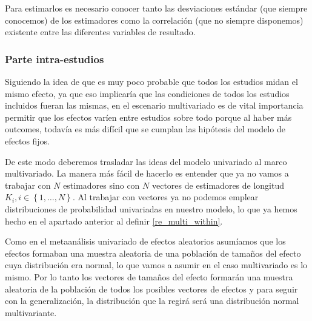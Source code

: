 \documentclass[a4paper,openright,12pt]{report}
\begin{document}
Para estimarlos es necesario conocer tanto las desviaciones estándar (que siempre conocemos) de los estimadores como la correlación (que no siempre disponemos) existente entre las diferentes variables de resultado.
\subsubsection{Parte intra-estudios}
Siguiendo la idea de que es muy poco probable que todos los estudios midan el mismo efecto, ya que eso implicaría que las condiciones de todos los estudios incluidos fueran las mismas, en el escenario multivariado es de vital importancia permitir que los efectos varíen entre estudios sobre todo porque al haber más outcomes, todavía es más difícil que se cumplan las hipótesis del modelo de efectos fijos.

De este modo deberemos trasladar las ideas del modelo univariado al marco multivariado. La manera más fácil de hacerlo es entender que ya no vamos a trabajar con $N$ estimadores sino con 
$N$ vectores de estimadores de longitud $K_{i}, i \in \left\lbrace 1, \ldots, N \right\rbrace$. Al trabajar con vectores ya no podemos emplear distribuciones de probabilidad univariadas en nuestro modelo, lo que ya hemos hecho en el apartado anterior al definir \ref{re_multi_within}. 

Como en el metaanálisis univariado de efectos aleatorios asumíamos que los efectos formaban una muestra aleatoria de una población de tamaños del efecto cuya distribución era normal, lo que vamos a asumir en el caso multivariado es lo mismo. Por lo tanto los vectores de tamaños del efecto formarán una muestra aleatoria de la población de todos los posibles vectores de efectos y para seguir con la generalización, la distribución que la regirá será una distribución normal multivariante. 
\end{document}
